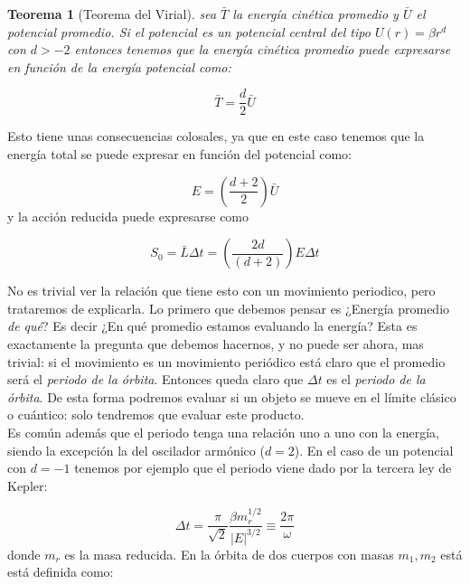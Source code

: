\documentclass[12pt,a4paper]{article}
\numberwithin{equation}{section}
\numberwithin{figure}{section}
\newcommand{\parentesis}[1]{\left( #1  \right)}
\newtheorem{theorem}{Teorema}[section]
\begin{document}
\begin{theorem}[Teorema del Virial]
sea  $\bar{T}$ la energía cinética promedio y $\bar{U}$ el potencial promedio. Si el potencial es un potencial central del tipo $U(r) =  \beta r^d$ con $d>-2$ entonces tenemos que la energía cinética promedio puede expresarse en función de la energía potencial como:

\begin{equation}
\bar{T} = \dfrac{d}{2} \bar{U}
\end{equation}
\end{theorem}

Esto tiene unas consecuencias colosales, ya que en este caso tenemos que la energía total se puede expresar en función del potencial como:

\begin{equation}
E = \parentesis{\dfrac{d+2}{2}} \bar{U}
\end{equation}
y la acción reducida puede expresarse como

\begin{equation}
S_0 = \bar{L} \Delta t = \parentesis{ \dfrac{2d}{(d+2)}} E \Delta t \label{Ec:03.4}
\end{equation}

No es trivial ver la relación que tiene esto con un movimiento periodico, pero trataremos de explicarla. Lo primero que debemos pensar es ¿Energía promedio \textit{de qué}? Es decir ¿En qué promedio estamos evaluando la energía? Esta es exactamente la pregunta que debemos hacernos, y no puede ser ahora, mas trivial: si el movimiento es un movimiento periódico está claro que el promedio será el \textit{periodo de la órbita}. Entonces queda claro que $\Delta t$ es el \textit{periodo de la órbita}. De esta forma podremos evaluar si un objeto se mueve en el límite clásico o cuántico: solo tendremos que evaluar este producto. \\

Es común además que el periodo tenga una relación uno a uno con la energía, siendo la excepción la del oscilador armónico ($d=2$). En el caso de un potencial con $d=-1$ tenemos por ejemplo que el periodo viene dado por la tercera ley de Kepler:

\begin{equation} 
\Delta t = \dfrac{\pi}{\sqrt{2}} \dfrac{\beta m_r^{1/2}}{|E|^{3/2}} \equiv \dfrac{2 \pi}{\omega}
\end{equation}
donde $m_r$ es la masa reducida. En la órbita de dos cuerpos con masas $m_1,m_2$ está está definida como:
\end{document}
